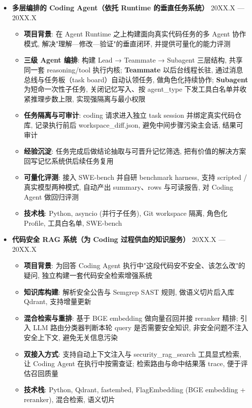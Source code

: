 \documentclass[zh]{resume}
\begin{document}
\begin{itemize}
    \item \textbf{多层编排的 Coding Agent（依托 Runtime 的垂直任务系统）} \hfill 20XX.X --- 20XX.X
    \begin{itemize}
        \item \textbf{项目背景}: 在 Agent Runtime 之上构建面向真实代码任务的多 Agent 协作模式, 解决"理解—修改—验证"的垂直闭环, 并提供可量化的能力评测
        \item \textbf{三级 Agent 编排}: 构建 Lead → Teammate → Subagent 三层结构, 共享同一套 reasoning/tool 执行内核; \textbf{Teammate} 以后台线程长驻, 通过消息总线与任务板（task board）自动认领任务, 做角色化持续协作; \textbf{Subagent} 为短命一次性子任务, 关闭记忆写入、按 agent\_type 下发工具白名单并收紧推理步数上限, 实现强隔离与最小权限
        \item \textbf{任务隔离与可审计}: coding 请求进入独立 task session 并绑定真实代码仓库, 记录执行前后 workspace\_diff.json, 避免中间步骤污染主会话, 结果可审计
        \item \textbf{经验沉淀}: 任务完成后做结论抽取与可晋升记忆筛选, 把有价值的解决方案回写记忆系统供后续任务复用
        \item \textbf{可量化评测}: 接入 SWE-bench 并自研 benchmark harness, 支持 scripted / 真实模型两种模式, 自动产出 summary、rows 与可读报告, 对 Coding Agent 做回归评测
        \item \textbf{技术栈}: Python, asyncio (并行子任务), Git workspace 隔离, 角色化 Profile, 工具白名单, SWE-bench
    \end{itemize}

    \item \textbf{代码安全 RAG 系统（为 Coding 过程供血的知识服务）} \hfill 20XX.X --- 20XX.X
    \begin{itemize}
        \item \textbf{项目背景}: 为回答 Coding Agent 执行中"这段代码安不安全、该怎么改"的疑问, 独立构建一套代码安全检索增强系统
        \item \textbf{知识库构建}: 解析安全公告与 Semgrep SAST 规则, 做语义切片后入库 Qdrant, 支持增量更新
        \item \textbf{混合检索与重排}: 基于 BGE embedding 做向量召回并接 reranker 精排; 引入 LLM 路由分类器判断本轮 query 是否需要安全知识, 非安全问题不注入安全上下文, 避免无关信息污染
        \item \textbf{双接入方式}: 支持自动上下文注入与 security\_rag\_search 工具显式检索, 让 Coding Agent 在执行中按需查证; 检索路由与命中结果落 trace, 便于评估召回质量
        \item \textbf{技术栈}: Python, Qdrant, fastembed, FlagEmbedding (BGE embedding + reranker), 混合检索, 语义切片
    \end{itemize}
\end{itemize}
\end{document}
